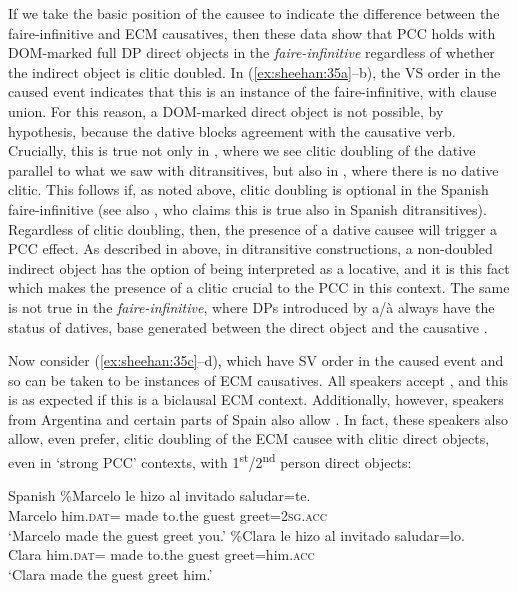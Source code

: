 \documentclass[output=paper,colorlinks,citecolor=brown,nonflat]{./langscibook}
\begin{document}
If we take the basic position of the causee to indicate the difference between the faire-infinitive and ECM causatives, then these data show that PCC holds with DOM-marked full DP direct objects in the \textit{faire-infinitive} regardless of whether the indirect object is clitic doubled. In (\ref{ex:sheehan:35a}--b), the VS order in the caused event indicates that this is an instance of the faire-infinitive, with clause union. For this reason, a DOM-marked direct object is not possible, by hypothesis, because the dative blocks agreement with the causative verb. Crucially, this is true not only in , where we see clitic doubling of the dative parallel to what we saw with ditransitives, but also in , where there is no dative clitic. This follows if, as noted above, clitic doubling is optional in the Spanish faire-infinitive (see also \citealt{Pineda2013}, who claims this is true also in Spanish ditransitives). Regardless of clitic doubling, then, the presence of a dative causee will trigger a PCC effect. As described in  above, in ditransitive constructions, a non-doubled indirect object has the option of being interpreted as a locative, and it is this fact which makes the presence of a clitic crucial to the PCC in this context. The same is not true in the \textit{faire-infinitive}, where DPs introduced by a/à always have the status of datives, base generated between the direct object and the causative \liv . 

Now consider (\ref{ex:sheehan:35c}--d), which have SV order in the caused event and so can be taken to be instances of ECM causatives. All speakers accept , and this is as expected if this is a biclausal ECM context. Additionally, however, speakers from Argentina and certain parts of Spain also allow . In fact, these speakers also allow, even prefer, clitic doubling of the ECM causee with clitic direct objects, even in ‘strong PCC’ contexts, with 1\textsuperscript{st}/2\textsuperscript{nd} person direct objects:

\ea%
    \label{ex:sheehan:36}
    Spanish
    \ea\label{ex:sheehan:36a}
    \gll    \%Marcelo   le   hizo   al   invitado saludar=te.\\
            Marcelo   him.\textsc{dat=}   made   to.the   guest  greet=\textsc{2sg}.\textsc{acc}\\
    \glt    ‘Marcelo made the guest greet you.’
    \ex\label{ex:sheehan:36b}
    \gll    \%Clara   le   hizo   al   invitado   saludar=lo.\\
            Clara   him.\textsc{dat=} made   to.the   guest   greet=him.\textsc{acc}\\
    \glt    ‘Clara made the guest greet him.’ 
    \z
\z
\end{document}
